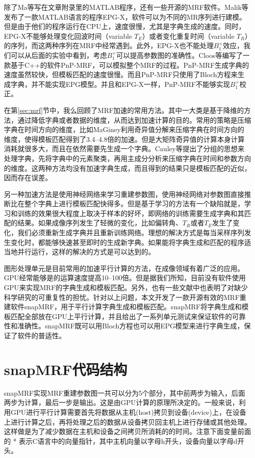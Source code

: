 除了Ma等\cite{mrf}写在文章附录里的MATLAB程序，还有一些开源的MRF软件。Malik等\cite{malik_extended_2018}发布了一款MATLAB语言的程序EPG-X，软件可以为不同的MR序列进行建模。但是由于他们的程序运行在CPU上，速度很慢，尤其是字典生成的速度。同时，EPG-X不能够处理变化回波时间（variable $T_E$）或者变化重复时间（variable $T_R$）的序列，而这两种序列在MRF中经常遇到。此外，EPG-X也不能处理$B_1^+$效应，我们可以从后面的实验中看到，考虑$B_1^+$可以提高参数图的准确性。Cloos\cite{cline2017air}等编写了一款基于C++的软件PnP-MRF，可以模拟整个MRF的过程。PnP-MRF生成字典的速度虽然较快，但模板匹配的速度很慢。而且PnP-MRF只使用了Bloch方程来生成字典，并不能实现EPG模型。并且和EPG-X一样，PnP-MRF不能够实现$B_1^+$校正。

在第\ref{sec:mrf}节中，我么回顾了MRF加速的常用方法。其中一大类是基于降维的方法，通过降低字典或者数据的维度，从而达到加速计算的目的。常用的策略是压缩字典在时间方向的维度，比如MaGiney\cite{svdmrf}利用奇异值分解来压缩字典在时间方向的维度，使得模板匹配得到了3.4--4.8倍的加速。但是大矩阵奇异值的计算本身计算消耗就很多大，而且在依然需要先生成一个字典。Cauley等\cite{groupingmrf}提出了分组的思想来处理字典，先将字典中的元素聚类，再用主成分分析来压缩字典在时间和参数方向的维度。这两种方法均没有加速字典生成，而且得到的结果只是模板匹配的近似，因而存在误差。

另一种加速方法是使用神经网络来学习重建参数图\cite{cohen2018mr}，使用神经网络对参数图直接推断比在整个字典上进行模板匹配快得多。但是基于学习的方法有一个缺陷就是，学习和训练的效果很大程度上取决于样本的好坏，即网络的训练需要生成字典和其匹配的结果。如果成像序列发生了轻微的变化，比如偏转角、$T_R$或者$T_E$发生了变化，我们必须重新生成字典并且重新训练网络。理想的解决方式是每当采样序列发生变化时，都能够快速甚至即时的生成新字典。如果能将字典生成和匹配的程序适当地并行运行，这样的解决的方式是可以达到的。

图形处理单元是目前常用的加速平行计算的方法，在成像领域有着广泛的应用\cite{Knoll,gpu,Sorensen,tron}。GPU经常能够是的运算速度提高10--100倍。但是据我们所知，目前没有软件使用GPU来实现MRF的字典生成和模板匹配。另外，也有一些文献中也表明了对缺少科学研究的可重复性的担忧\cite{vasilevsy_repro_2013,osc_repro_2015,collins_repro_2014,begley_repro_2015}。针对以上问题，本文开发了一款开源有效的MRF重建软件snapMRF，用于平行计算字典生成和模板匹配。snapMRF将字典生成和模板匹配全部放在GPU上平行计算，并且给出了一系列单元测试来保证软件的可靠性和准确性。snapMRF既可以用Bloch方程也可以用EPG模型来进行字典生成，保证了软件的普适性。

\section{snapMRF代码结构}
snapMRF实现MRF重建参数图一共可以分为5个部分，其中前两步为输入，后面两步为计算，最后一步是输出。这是由GPU计算的原理所决定的。一般来说，利用GPU进行平行计算需要首先将数据从主机(host)拷贝到设备(device)上，在设备上进行计算之后，再将处理之后的数据从设备拷贝回主机上进行存储或其他处理。这样做是为了减少数据在主机和设备之间拷贝所消耗的的时间。注意下面变量前面的 * 表示C语言中的向量指针，其中主机向量以字母h开头，设备向量以字母d开头。


